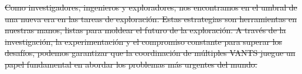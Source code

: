 \documentclass[sigconf]{acmart}
\providecommand{\DIFdel}[1]{{\protect\color{red}\sout{#1}}}                      %
\providecommand{\DIFaddbegin}{} %
\providecommand{\DIFaddend}{} %
\providecommand{\DIFdelbegin}{} %
\providecommand{\DIFdelend}{} %
\begin{document}

\DIFdelbegin \DIFdel{Como investigadores, ingenieros y exploradores, nos encontramos en el umbral de una nueva era en las tareas de exploración. Estas estrategias son herramientas en nuestras manos, listas para moldear el futuro de la exploración. A través de la investigación, la experimentación y el compromiso constante para superar los desafíos, podemos garantizar que la coordinación de múltiples VANTS juegue un papel fundamental en abordar los problemas más urgentes del mundo.
}\DIFdelend %



\DIFdelbegin %
\DIFdelend \DIFaddbegin {}
\DIFaddend 
\DIFaddbegin 

\DIFaddend 
\end{document}

